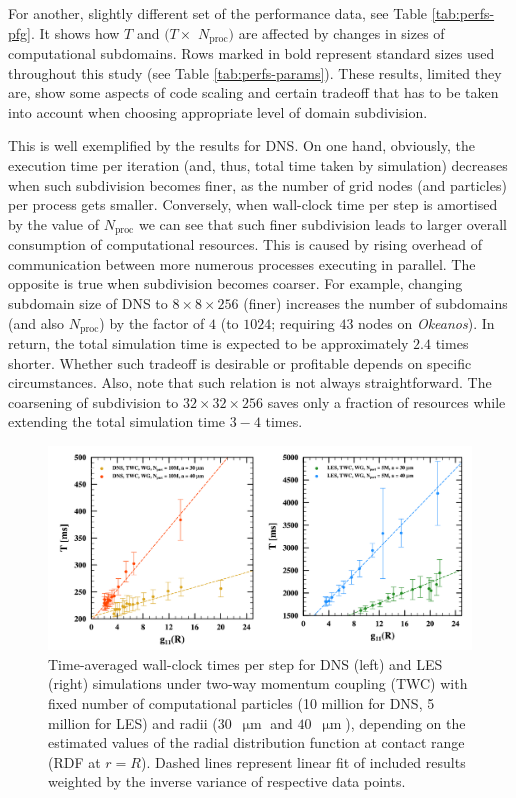 \documentclass{pracamgren}
\begin{document}
For another, slightly different set of the performance data, see Table \ref{tab:perfs-pfg}.
It shows how $T$ and $(T \times$ $N_{\text{proc}})$ are affected by changes in sizes of computational subdomains.
Rows marked in bold represent standard sizes used throughout this study (see Table \ref{tab:perfs-params}).
These results, limited they are, show some aspects of code scaling and certain tradeoff that has to be taken into account when choosing appropriate level of domain subdivision.

This is well exemplified by the results for DNS.
On one hand, obviously, the execution time per iteration (and, thus, total time taken by simulation) decreases when such subdivision becomes finer, as the number of grid nodes (and particles) per process gets smaller.
Conversely, when wall-clock time per step is amortised by the value of $N_{\text{proc}}$ we can see that such finer subdivision leads to larger overall consumption of computational resources.
This is caused by rising overhead of communication between more numerous processes executing in parallel.
The opposite is true when subdivision becomes coarser.
For example, changing subdomain size of DNS to $8 \times 8 \times 256$ (finer) increases the number of subdomains (and also $N_{\text{proc}}$) by the factor of $4$ (to $1024$; requiring $43$ nodes on \emph{Okeanos}).
In return, the total simulation time is expected to be approximately $2.4$ times shorter.
Whether such tradeoff is desirable or profitable depends on specific circumstances.
Also, note that such relation is not always straightforward.
The coarsening of subdivision to $32 \times 32 \times 256$ saves only a fraction of resources while extending the total simulation time $3-4$ times.

\medskip

\begin{figure}[h]
\centering
\includegraphics[width=13.5cm]{figures/3-05_pfsrdf.pdf}
\caption{
Time-averaged wall-clock times per step for DNS (left) and LES (right) simulations under two-way momentum coupling (TWC) with fixed number of computational particles (10 million for DNS, 5 million for LES) and radii ($30$~$\upmu\text{m}$ and $40$~$\upmu\text{m}$), depending on the estimated values of the radial distribution function at contact range (RDF at $r=R$).
Dashed lines represent linear fit of included results weighted by the inverse variance of respective data points.
}
\label{fig:pfsrdf}
\end{figure}
\end{document}
